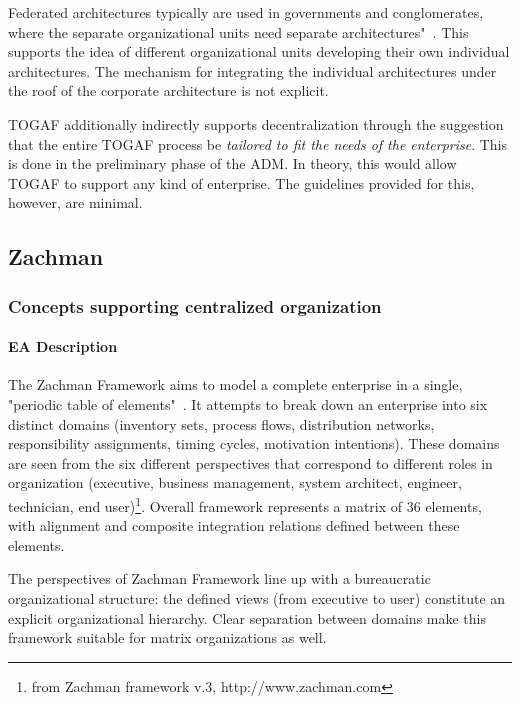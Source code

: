 Federated architectures typically are used in governments and conglomerates, where the separate organizational units need separate architectures"~\cite{togaf9.1}. This supports the idea of different organizational units developing their own individual architectures. The mechanism for integrating the individual architectures under the roof of the corporate architecture is not explicit. 


TOGAF additionally indirectly supports decentralization through the suggestion that the entire TOGAF process be\textit{ tailored to fit the needs of the enterprise}. This is done in the preliminary phase of the ADM. In theory, this would allow TOGAF to support any kind of enterprise. The guidelines provided for this, however, are minimal. 

\subsection{Zachman}
\subsubsection{Concepts supporting centralized organization}

\paragraph*{EA Description}
The Zachman Framework aims to model a complete enterprise in a single, "periodic table of elements"~\cite{Bente2012}. It attempts to break down an enterprise into six distinct domains (inventory sets, process flows, distribution networks, responsibility assignments, timing cycles, motivation intentions). These domains are seen from the six different perspectives that correspond to different roles in organization (executive, business management, system architect, engineer, technician, end user)\footnote{from Zachman framework v.3, http://www.zachman.com}. Overall framework represents a matrix of 36 elements, with alignment and composite integration relations defined between these elements. 

The perspectives of Zachman Framework line up with a bureaucratic organizational structure: the defined views (from executive to user) constitute an explicit organizational hierarchy. Clear separation between domains make this framework suitable for matrix organizations as well. 

